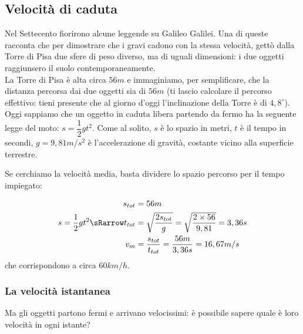 \subsection{Velocità di caduta}
\label{subsec:differenziazione_velcaduta}
Nel Settecento fiorirono alcune leggende su Galileo Galilei. Una di queste 
racconta che per dimostrare che i gravi cadono con la stessa velocità, 
gettò dalla Torre di Pisa due sfere di peso diverso, ma di uguali 
dimensioni: i due oggetti raggiunsero il suolo 
contemporaneamente.\\
La Torre di Pisa è alta circa \(56m\) e immaginiamo, per semplificare, 
che la distanza percorsa dai due oggetti sia di \(56m\) (ti lascio 
calcolare il percorso effettivo: tieni presente che al giorno d'oggi 
l'inclinazione della Torre è di \(4,8^\circ\)).\\
Oggi sappiamo che un oggetto in caduta libera partendo da fermo ha la 
seguente legge del moto:
\(s=\dfrac{1}{2}gt^2\). Come al solito, \(s\) è lo spazio in metri, 
\(t\) è il tempo in secondi, \(g=9,81 m/s^2\) è l'accelerazione di 
gravità, costante vicino alla superficie terrestre.

\newpage %

Se cerchiamo la velocità media, basta dividere lo spazio percorso per il 
tempo impiegato:

\begin{align*}
 s_{tot} &= 56m\\
 s=\frac{1}{2}gt^2 \sRarrow t_{tot} &= \sqrt{\frac{2s_{tot}}{g}}=
 \sqrt{\frac{2\times 56}{9,81}}=3,36 s\\
 v_m &= \frac{s_{tot}}{t_{tot}}=\frac{56 m}{3,36 s}=16,67 m/s
\end{align*}
che corrispondono a circa \(60 km/h\).

\subsubsection{La velocità istantanea}

Ma gli oggetti partono fermi e arrivano velocissimi: 
è possibile sapere quale è loro velocità in ogni istante?

